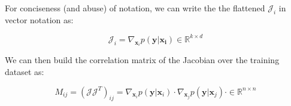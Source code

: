 \documentclass{article}
\newcommand{\R}{\mathbb{R}}
\newcommand{\matr}[1]{\mathbf{#1}}
\begin{document}
For conciseness (and abuse) of notation, we can write the the flattened $\mathcal{J}_i$ in vector notation as:

\begin{equation}
\mathcal{J}_i = \nabla_{\matr{x}_i} p(\matr{y} | \matr{x_i}) \in \R^{k \times d}
\end{equation}

We can then build the correlation matrix of the Jacobian over the training dataset as:

\begin{equation}
M_{ij} = (\mathcal{J} \mathcal{J}^T)_{ij} = \nabla_{\matr{x}_i} p(\matr{y}|\matr{x}_i) \cdot \nabla_{\matr{x}_j} p(\matr{y}|\matr{x}_j) \cdot \in \R^{n \times n} 
\end{equation}




\end{document}
